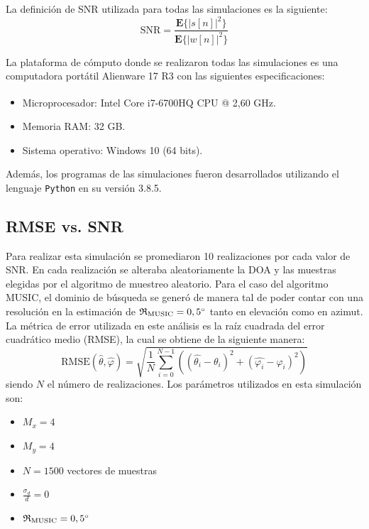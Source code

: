 La definición de SNR utilizada para todas las simulaciones es la siguiente:
\begin{equation}
    \mathrm{SNR}=\frac{\mathbf{E}\{|s[n]|^2\}}{\mathbf{E}\{|w[n]|^2\}}
\end{equation}

La plataforma de cómputo donde se realizaron todas las simulaciones es una computadora portátil Alienware 17 R3 con las siguientes especificaciones:
\begin{itemize}
    \item Microprocesador: Intel\textsuperscript{\textregistered} Core\textsuperscript{\texttrademark} i7-6700HQ CPU @ 2,60 GHz.
    \item Memoria RAM: 32 GB.
    \item Sistema operativo: Windows 10 (64 bits).
\end{itemize}

Además, los programas de las simulaciones fueron desarrollados utilizando el lenguaje \texttt{Python} en su versión 3.8.5.

\subsection{RMSE vs. SNR}\label{subc:doaest_error_vs_snr}

Para realizar esta simulación se promediaron 10 realizaciones por cada valor de SNR. En cada realización se alteraba aleatoriamente la DOA y las muestras elegidas por el algoritmo de muestreo aleatorio. Para el caso del algoritmo MUSIC, el dominio de búsqueda se generó de manera tal de poder contar con una resolución en la estimación de $\mathfrak{R}_{\textrm{MUSIC}}=0,5^{\circ}$ tanto en elevación como en azimut. La métrica de error utilizada en este análisis es la raíz cuadrada del error cuadrático medio (RMSE), la cual se obtiene de la siguiente manera:
\begin{equation}
    \textrm{RMSE}(\hat{\theta},\hat{\varphi})=\sqrt{\frac{1}{N}\sum^{N-1}_{i=0}\left( \left(\hat{\theta_i}-\theta_i \right)^2 + \left(\hat{\varphi_i}-\varphi_i \right)^2\right)}
\end{equation}
siendo $N$ el número de realizaciones.
Los parámetros utilizados en esta simulación son:
\begin{itemize}
    \item $M_x = 4$
    \item $M_y = 4$
    \item $N = 1500$ vectores de muestras
    \item $\frac{\sigma_d}{d}=0$
    \item $\mathfrak{R}_{\textrm{MUSIC}}=0,5^{\circ}$
\end{itemize}

